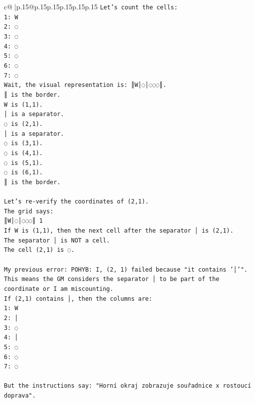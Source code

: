 \documentclass{article}
\begin{document}
{\begin{supertabular}{c@{$\;$}|p{.15\linewidth}@{}p{.15\linewidth}p{.15\linewidth}p{.15\linewidth}p{.15\linewidth}p{.15\linewidth}}
{{{\texttt{Let's count the cells:} \\
\texttt{1: W} \\
\texttt{2: ◌} \\
\texttt{3: ◌} \\
\texttt{4: ◌} \\
\texttt{5: ◌} \\
\texttt{6: ◌} \\
\texttt{7: ◌} \\
\texttt{Wait, the visual representation is: ║W│◌│◌◌◌║.} \\
\texttt{║ is the border.} \\
\texttt{W is (1,1).} \\
\texttt{│ is a separator.} \\
\texttt{◌ is (2,1).} \\
\texttt{│ is a separator.} \\
\texttt{◌ is (3,1).} \\
\texttt{◌ is (4,1).} \\
\texttt{◌ is (5,1).} \\
\texttt{◌ is (6,1).} \\
\texttt{║ is the border.} \\
\\ 
\texttt{Let's re{-}verify the coordinates of (2,1).} \\
\texttt{The grid says:} \\
\texttt{║W│◌│◌◌◌║ 1} \\
\texttt{If W is (1,1), then the next cell after the separator │ is (2,1).} \\
\texttt{The separator │ is NOT a cell.} \\
\texttt{The cell (2,1) is ◌.} \\
\\ 
\texttt{My previous error: POHYB: I, (2, 1) failed because "it contains '│'". This means the GM considers the separator │ to be part of the coordinate or I am miscounting.} \\
\texttt{If (2,1) contains │, then the columns are:} \\
\texttt{1: W} \\
\texttt{2: │} \\
\texttt{3: ◌} \\
\texttt{4: │} \\
\texttt{5: ◌} \\
\texttt{6: ◌} \\
\texttt{7: ◌} \\
\\ 
\texttt{But the instructions say: "Horní okraj zobrazuje souřadnice x rostoucí doprava".} \\
}}}
\end{supertabular}}
\end{document}
